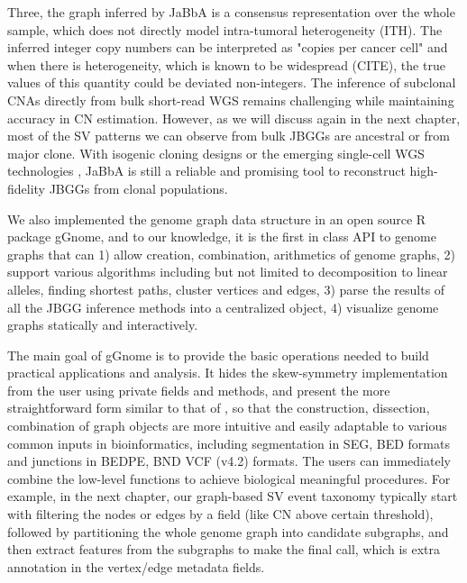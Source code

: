 \documentclass[phd,tocprelim]{cornell}
\begin{document}
Three, the graph inferred by JaBbA is a consensus representation over the whole sample, which does not directly model intra-tumoral heterogeneity (ITH). The inferred integer copy numbers can be interpreted as "copies per cancer cell" and when there is heterogeneity, which is known to be widespread (CITE), the true values of this quantity could be deviated non-integers. The inference of subclonal CNAs directly from bulk short-read WGS remains challenging \cite{McPherson2017-ry} while maintaining accuracy in CN estimation. However, as we will discuss again in the next chapter, most of the SV patterns we can observe from bulk JBGGs are ancestral or from major clone. With isogenic cloning designs \cite{Dewhurst2021-jk} or the emerging single-cell WGS technologies \cite{Zahn2017-re,laks2019,Salehi2021-xi}, JaBbA is still a reliable and promising tool to reconstruct high-fidelity JBGGs from clonal populations.

We also implemented the genome graph data structure in an open source R package gGnome, and to our knowledge, it is the first in class API to genome graphs that can 1) allow creation, combination, arithmetics of genome graphs, 2) support various algorithms including but not limited to decomposition to linear alleles, finding shortest paths, cluster vertices and edges, 3) parse the results of all the JBGG inference methods into a centralized object, 4) visualize genome graphs statically and interactively.

The main goal of gGnome is to provide the basic operations needed to build practical applications and analysis. It hides the skew-symmetry implementation from the user using private fields and methods, and present the more straightforward form similar to that of \cite{Greenman:2012eg}, so that the construction, dissection, combination of graph objects are more intuitive and easily adaptable to various common inputs in bioinformatics, including segmentation in SEG, BED formats and junctions in BEDPE, BND VCF (v4.2) formats. The users can immediately combine the low-level functions to achieve biological meaningful procedures. For example, in the next chapter, our graph-based SV event taxonomy typically start with filtering the nodes or edges by a field (like CN above certain threshold), followed by partitioning the whole genome graph into candidate subgraphs, and then extract features from the subgraphs to make the final call, which is extra annotation in the vertex/edge metadata fields.
\end{document}

